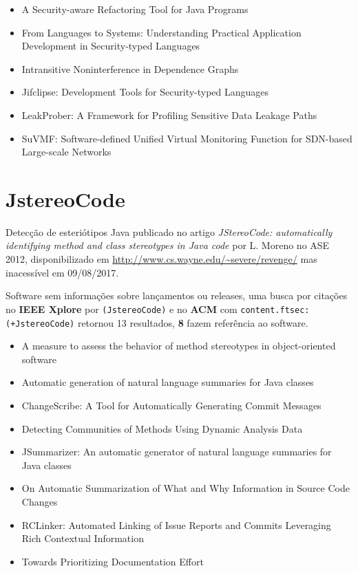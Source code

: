 \begin{itemize}
\item A Security-aware Refactoring Tool for Java Programs
\item From Languages to Systems: Understanding Practical Application Development in Security-typed Languages
\item Intransitive Noninterference in Dependence Graphs
\item Jifclipse: Development Tools for Security-typed Languages
\item LeakProber: A Framework for Profiling Sensitive Data Leakage Paths
\item SuVMF: Software-defined Unified Virtual Monitoring Function for SDN-based Large-scale Networks
\end{itemize}

\section{JstereoCode}

Detecção de esteriótipos Java
publicado no artigo {\it JStereoCode: automatically identifying method and class stereotypes in Java code}
por L. Moreno
no ASE 2012,
disponibilizado em \url{http://www.cs.wayne.edu/~severe/revenge/}
mas inacessível em 09/08/2017.

Software sem informações sobre lançamentos ou releases,
uma busca por citações no {\bf IEEE Xplore} por
\texttt{(JstereoCode)}
e no {\bf ACM} com
\texttt{content.ftsec:(+JstereoCode)}
retornou
13 resultados,
{\bf 8} fazem referência ao software.

\begin{itemize}
\item A measure to assess the behavior of method stereotypes in object-oriented software
\item Automatic generation of natural language summaries for Java classes
\item ChangeScribe: A Tool for Automatically Generating Commit Messages
\item Detecting Communities of Methods Using Dynamic Analysis Data
\item JSummarizer: An automatic generator of natural language summaries for Java classes
\item On Automatic Summarization of What and Why Information in Source Code Changes
\item RCLinker: Automated Linking of Issue Reports and Commits Leveraging Rich Contextual Information
\item Towards Prioritizing Documentation Effort
\end{itemize}

